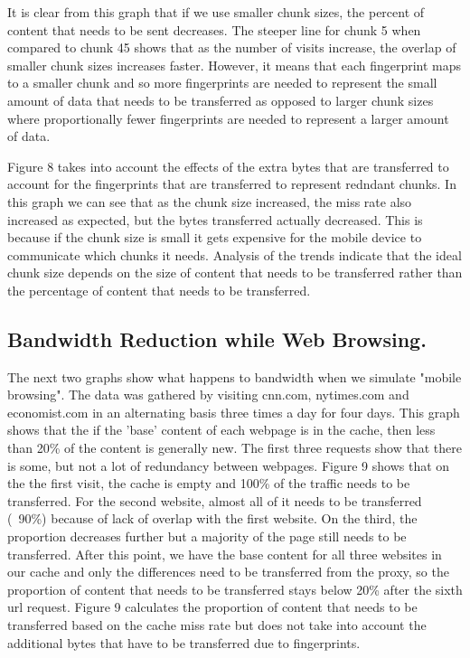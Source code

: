 It is clear from this graph that if we use smaller chunk sizes, the percent of content that needs to be sent decreases. 
The steeper line for chunk 5 when compared to chunk 45 shows that as the number of visits increase, the overlap of smaller chunk sizes increases faster.
However, it means that each fingerprint maps to a smaller chunk and so more fingerprints are needed to represent the small amount of data that needs to be transferred as opposed to larger chunk sizes where proportionally fewer fingerprints are needed to represent a larger amount of data. 

Figure 8 takes into account the effects of the extra bytes that are transferred to account for the fingerprints that are transferred to represent redndant chunks. In this graph we can see that as the chunk size increased, the miss rate also increased as expected, but the bytes transferred actually decreased. 
This is because if the chunk size is small it gets expensive for the mobile device to communicate which chunks it needs. 
Analysis of the trends indicate that the ideal chunk size depends on the size of content that needs to be transferred rather than the percentage of content that needs to be transferred.

\subsection{Bandwidth Reduction while Web Browsing.}
The next two graphs show what happens to bandwidth when we simulate "mobile browsing". 
The data was gathered by visiting cnn.com, nytimes.com and economist.com in an alternating basis three times a day for four days. This graph shows that the if the 'base' content of each webpage is in the cache, then less than 20\% of the content is generally new. The first three requests show that there is some, but not a lot of redundancy between webpages.
Figure 9 shows that on the the first visit, the cache is empty and 100\% of the traffic needs to be transferred. 
For the second website, almost all of it needs to be transferred (~90\%) because of lack of overlap with the first website. 
On the third, the proportion decreases further but a majority of the page still needs to be transferred. 
After this point, we have the base content for all three websites in our cache and only the differences need to be transferred from the proxy, so the proportion of content that needs to be transferred stays below 20\% after the sixth url request. 
Figure 9 calculates the proportion of content that needs to be transferred based on the cache miss rate but does not take into account the additional bytes that have to be transferred due to fingerprints.

